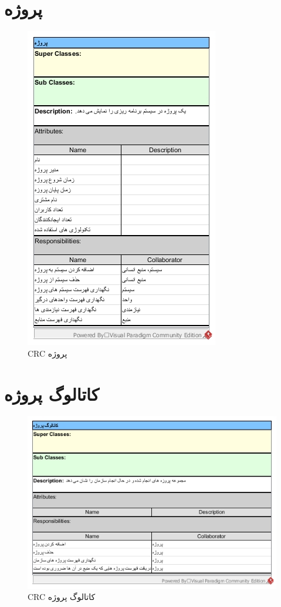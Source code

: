 \section{پروژه}
\begin{figure}[H]
	\centering
	\includegraphics[scale=1]{img/crc/Project}
	\caption{CRC پروژه }
\end{figure}

\section{کاتالوگ پروژه}
\begin{figure}[H]
	\centering
	\includegraphics[scale=0.8]{img/crc/ProjectCatalogue}
	\caption{CRC کاتالوگ پروژه }
\end{figure}

